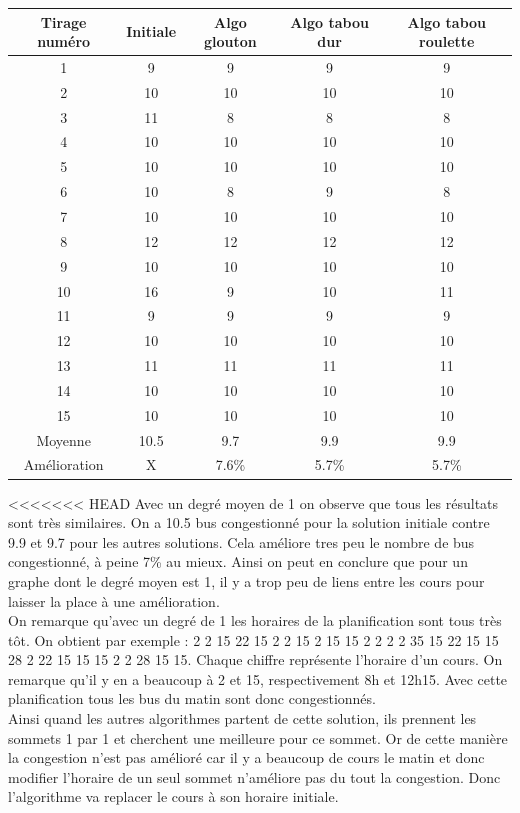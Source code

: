 \documentclass[a4paper,11pt]{article}
\begin{document}
	\begin{tabular}{|c|c|c|c|c|}
  		\hline
  		Tirage numéro & Initiale & Algo glouton & Algo tabou dur & Algo tabou roulette\\
  		\hline
  		1 & 9 & 9 & 9 & 9\\
  		\hline
  		2 & 10 & 10 & 10 & 10\\
  		\hline
  		3 & 11 & 8 & 8 & 8\\
  		\hline
  		4 & 10 & 10 & 10 & 10\\
  		\hline
  		5 & 10 & 10 & 10 & 10\\
  		\hline
  		6 & 10 & 8 & 9 & 8\\
  		\hline
  		7 & 10 & 10 & 10 & 10\\
  		\hline
  		8 & 12 & 12 & 12 & 12\\
  		\hline
  		9 & 10 & 10 & 10 & 10\\
  		\hline
  		10 & 16 & 9 & 10 & 11\\
  		\hline
  		11 & 9 & 9 & 9 & 9\\
  		\hline
  		12 & 10 & 10 & 10 & 10\\
  		\hline
  		13 & 11 & 11 & 11 & 11\\
  		\hline
  		14 & 10 & 10 & 10 & 10\\
  		\hline
  		15 & 10 & 10 & 10 & 10\\
  		\hline
  		Moyenne & 10.5 & 9.7 & 9.9 & 9.9 \\
  		\hline
  		Amélioration & X & 7.6\% & 5.7\% & 5.7\%\\
  		\hline
	\end{tabular}
<<<<<<< HEAD
	Avec un degré moyen de 1 on observe que tous les résultats sont très similaires. On a 10.5 bus congestionné pour la solution initiale contre 9.9 et 9.7 pour les autres solutions. Cela améliore tres peu le nombre de bus congestionné, à peine 7\% au mieux. Ainsi on peut en conclure que pour un graphe dont le degré moyen est 1, il y a trop peu de liens entre les cours pour laisser la place à une amélioration.\\
	On remarque qu'avec un degré de 1 les horaires de la planification sont tous très tôt. On obtient par exemple : 2  2  15  22  15  2  2  15  2  15  15  2  2  2  2  35  15  22  15  15  28  2  22  15  15  15  2  2  28  15  15. Chaque chiffre représente l'horaire d'un cours. On remarque qu'il y en a beaucoup à 2 et 15, respectivement 8h et 12h15. Avec cette planification tous les bus du matin sont donc congestionnés.\\
	Ainsi quand les autres algorithmes partent de cette solution, ils prennent les sommets 1 par 1 et cherchent une meilleure pour ce sommet. Or de cette manière la congestion n'est pas amélioré car il y a beaucoup de cours le matin et donc modifier l'horaire de un seul sommet n'améliore pas du tout la congestion. Donc l'algorithme va replacer le cours à son horaire initiale. \\
\end{document}
